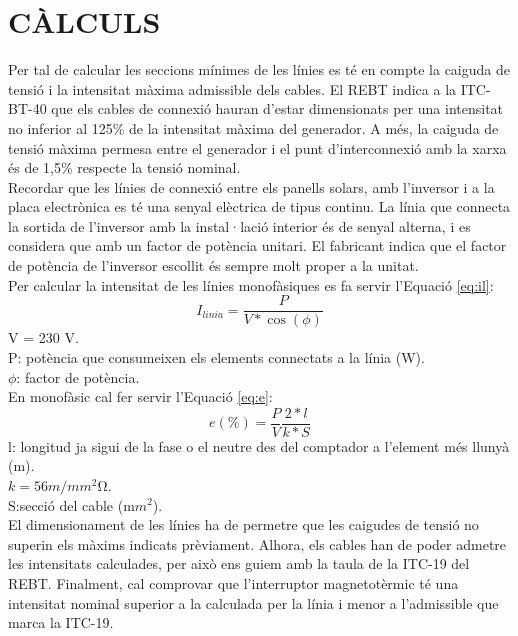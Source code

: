 \chapter{\uppercase{Càlculs}}
Per tal de calcular les seccions mínimes de les línies es té en compte la caiguda de tensió i la intensitat màxima admissible dels cables. El REBT indica a la ITC-BT-40 que els cables de connexió hauran d'estar dimensionats per una intensitat no inferior al 125\% de la intensitat màxima del generador. A més, la caiguda de tensió màxima permesa entre el generador i el punt d'interconnexió amb la xarxa és de 1,5\% respecte la tensió nominal.\\
\newline Recordar que les línies de connexió entre els panells solars, amb l'inversor i a la placa electrònica es té una senyal elèctrica de tipus continu. La línia que connecta la sortida de l'inversor amb la instal·lació interior és de senyal alterna, i es considera que amb un factor de potència unitari. El fabricant indica que el factor de potència de l'inversor escollit és sempre molt proper a la unitat.\\
\newline Per calcular la intensitat de les línies monofàsiques es fa servir l'Equació \ref{eq:il}:
\begin{equation} \label{eq:il}
I_{linia} = \frac{P}{V*\cos(\phi)}
\end{equation}
V = 230 V.\\
P: potència que consumeixen els elements connectats a la línia (W).\\
$\phi$: factor de potència.\\
\newline En monofàsic cal fer servir l'Equació \ref{eq:e}:
\begin{equation}\label{eq:e}
e(\%)=\frac{P}{V}\frac{2*l}{k*S}
\end{equation}
l: longitud ja sigui de la fase o el neutre des del comptador a l'element més llunyà (m).\\
$k = 56 m/mm^{2}\si{\ohm}$.\\
S:secció del cable (m$m^2$).\\
%
\newline El dimensionament de les línies ha de permetre que les caigudes de tensió no superin els màxims indicats prèviament. Alhora, els cables han de poder admetre les intensitats calculades, per això ens guiem amb la taula de la ITC-19 del REBT. Finalment, cal comprovar que  l'interruptor magnetotèrmic té una intensitat nominal superior a la calculada per la línia i menor a l'admissible que marca la ITC-19.\\
